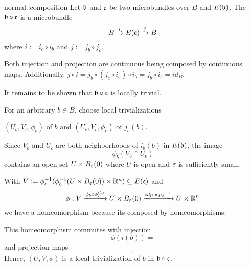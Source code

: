 \begin{mydefinition}{normal::composition}
    Let $\bb$ and $\bc$ be two microbundles over $B$ and $E(\bb)$.
    The  $\bb \circ \bc$ is a microbundle
    \[ \bundle{B}{E(\bc)}{i}{j} \]
    where $i := i_c \circ i_b$ and $j := j_b \circ j_c$.
\end{mydefinition}

\begin{myproof}
    Both injection and projection are continuous being composed by continuous maps.
    Additionally, $j \circ i = j_b \circ (j_c \circ i_c) \circ i_b = j_b \circ i_b = id_B$.

    It remains to be shown that $\bb \circ \bc$ is locally trivial.

    For an arbitrary $b \in B$, choose local trivializations
    \begin{center}
        $(U_b, V_b, \phi_b)$ of $b$ and $(U_c, V_c, \phi_c)$ of $j_b(b)$.
    \end{center}
    Since $V_b$ and $U_c$ are both neighborhoods of $i_b(b)$ in $E(\bb)$, the image
    \[ \phi_b(V_b \cap U_c) \]
    contains an open set $U \times \ball[\eps]$ where $U$ is open and $\eps$ is sufficiently small.

    With $V := \inv{\phi_c}(\inv{\phi_b}(U \times \ball[\eps]) \times \R^n) \sub E(\bc)$ and
    \[ \phi: V \xto{\phi_b \circ \frst{\phi_c}} U \times \ball[\eps] \xto{id_U \times \inv{\mu_\eps}} U \times \R^n \]
    we have a homeomorphism because its composed by homeomorphisms.

    This homeomorphism commutes with injection
    \[ \phi(i(b)) = \]
    and projection maps
    \[.\]
    Hence, $(U, V, \phi)$ is a local trivialization of $b$ in $\bb \circ \bc$.
\end{myproof}